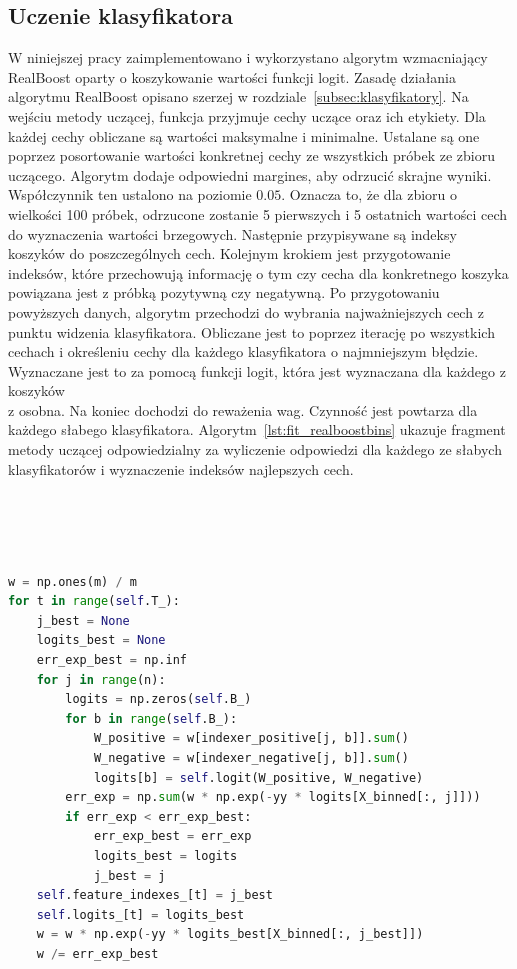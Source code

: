 \subsection{Uczenie klasyfikatora}
W niniejszej pracy zaimplementowano i wykorzystano algorytm wzmacniający RealBoost oparty o koszykowanie wartości funkcji logit.
Zasadę działania algorytmu RealBoost opisano szerzej w rozdziale~\ref{subsec:klasyfikatory}.
Na wejściu metody uczącej, funkcja przyjmuje cechy uczące oraz ich etykiety.
Dla każdej cechy obliczane są wartości maksymalne i minimalne.
Ustalane są one poprzez posortowanie wartości konkretnej cechy ze wszystkich próbek ze zbioru uczącego.
Algorytm dodaje odpowiedni margines, aby odrzucić skrajne wyniki.
Współczynnik ten ustalono na poziomie $0.05$.
Oznacza to, że dla zbioru o wielkości 100 próbek, odrzucone zostanie 5 pierwszych i 5 ostatnich wartości cech do wyznaczenia wartości brzegowych.
Następnie przypisywane są indeksy koszyków do poszczególnych cech.
Kolejnym krokiem jest przygotowanie indeksów, które przechowują informację o tym czy cecha dla konkretnego koszyka powiązana jest z próbką pozytywną czy negatywną.
Po przygotowaniu powyższych danych, algorytm przechodzi do wybrania najważniejszych cech z punktu widzenia klasyfikatora.
Obliczane jest to poprzez iterację po wszystkich cechach i określeniu cechy dla każdego klasyfikatora o najmniejszym błędzie.
Wyznaczane jest to za pomocą funkcji logit, która jest wyznaczana dla każdego z koszyków \\z osobna.
Na koniec dochodzi do reważenia wag.
Czynność jest powtarza dla każdego słabego klasyfikatora.
Algorytm~\ref{lst:fit_realboostbins} ukazuje fragment metody uczącej odpowiedzialny za wyliczenie odpowiedzi dla każdego ze słabych klasyfikatorów i wyznaczenie indeksów najlepszych cech.\\\\\\\\\\
\begin{lstlisting}[language=Python, caption=Procedura ucząca klasyfikator RealBoostBins., label={lst:fit_realboostbins}]
w = np.ones(m) / m
for t in range(self.T_):
    j_best = None
    logits_best = None
    err_exp_best = np.inf
    for j in range(n):
        logits = np.zeros(self.B_)
        for b in range(self.B_):
            W_positive = w[indexer_positive[j, b]].sum()
            W_negative = w[indexer_negative[j, b]].sum()
            logits[b] = self.logit(W_positive, W_negative)
        err_exp = np.sum(w * np.exp(-yy * logits[X_binned[:, j]]))
        if err_exp < err_exp_best:
            err_exp_best = err_exp
            logits_best = logits
            j_best = j
    self.feature_indexes_[t] = j_best
    self.logits_[t] = logits_best
    w = w * np.exp(-yy * logits_best[X_binned[:, j_best]])
    w /= err_exp_best

\end{lstlisting}
